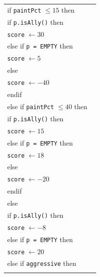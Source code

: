 \documentclass{article}
\newenvironment{pseudobox}
{
\centering
\begin{longtable}{|p{0.94\linewidth}|}
\hline
}
{
\\ \hline
\end{longtable}
\vspace{0.05cm}
}
\begin{document}
\begin{enumerate}[label=\alph*.]
\begin{enumerate}[label=\alph*.]
\begin{pseudobox}
\hspace*{1.5em}if \texttt{paintPct} $\leq 15$ then \\
\hspace*{3em}if \texttt{p.isAlly()} then \\
\hspace*{4.5em}\texttt{score} $\leftarrow 30$ \\
\hspace*{3em}else if \texttt{p = EMPTY} then \\
\hspace*{4.5em}\texttt{score} $\leftarrow 5$ \\
\hspace*{3em}else \\
\hspace*{4.5em}\texttt{score} $\leftarrow -40$ \\
\hspace*{3em}endif \\
\hspace*{1.5em}else if \texttt{paintPct} $\leq 40$ then \\
\hspace*{3em}if \texttt{p.isAlly()} then \\
\hspace*{4.5em}\texttt{score} $\leftarrow 15$ \\
\hspace*{3em}else if \texttt{p = EMPTY} then \\
\hspace*{4.5em}\texttt{score} $\leftarrow 18$ \\
\hspace*{3em}else \\
\hspace*{4.5em}\texttt{score} $\leftarrow -20$ \\
\hspace*{3em}endif \\
\hspace*{1.5em}else \\
\hspace*{3em}if \texttt{p.isAlly()} then \\
\hspace*{4.5em}\texttt{score} $\leftarrow -8$ \\
\hspace*{3em}else if \texttt{p = EMPTY} then \\
\hspace*{4.5em}\texttt{score} $\leftarrow 20$ \\
\hspace*{3em}else if \texttt{aggressive} then \\

\end{pseudobox}
\end{enumerate}
\end{enumerate}
\end{document}
